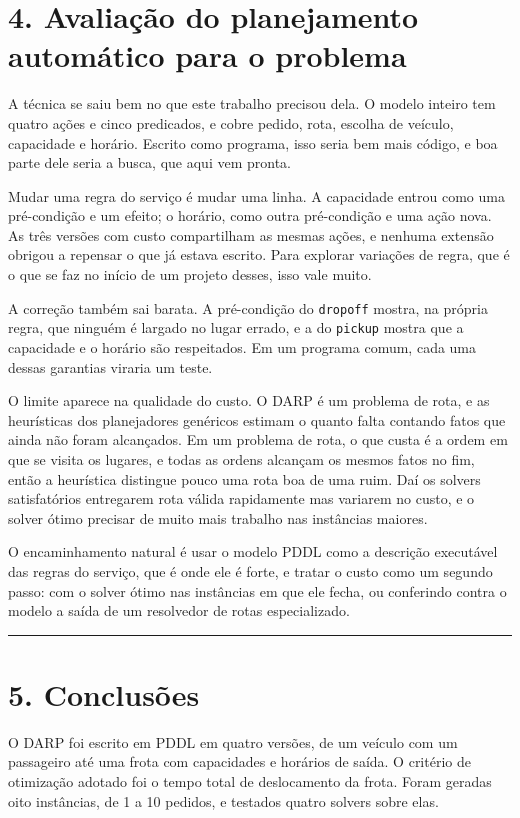 \documentclass[11pt,a4paper]{article}
\newcommand{\cod}[1]{\texttt{#1}}
\newcommand{\separador}{\begin{center}\rule{0.45\linewidth}{0.4pt}\end{center}}
\begin{document}
\section*{4. Avaliação do planejamento automático para o problema}

A técnica se saiu bem no que este trabalho precisou dela. O modelo inteiro tem quatro ações e cinco predicados, e cobre pedido, rota, escolha de veículo, capacidade e horário. Escrito como programa, isso seria bem mais código, e boa parte dele seria a busca, que aqui vem pronta.

Mudar uma regra do serviço é mudar uma linha. A capacidade entrou como uma pré-condição e um efeito; o horário, como outra pré-condição e uma ação nova. As três versões com custo compartilham as mesmas ações, e nenhuma extensão obrigou a repensar o que já estava escrito. Para explorar variações de regra, que é o que se faz no início de um projeto desses, isso vale muito.

A correção também sai barata. A pré-condição do \cod{dropoff} mostra, na própria regra, que ninguém é largado no lugar errado, e a do \cod{pickup} mostra que a capacidade e o horário são respeitados. Em um programa comum, cada uma dessas garantias viraria um teste.

O limite aparece na qualidade do custo. O DARP é um problema de rota, e as heurísticas dos planejadores genéricos estimam o quanto falta contando fatos que ainda não foram alcançados. Em um problema de rota, o que custa é a ordem em que se visita os lugares, e todas as ordens alcançam os mesmos fatos no fim, então a heurística distingue pouco uma rota boa de uma ruim. Daí os solvers satisfatórios entregarem rota válida rapidamente mas variarem no custo, e o solver ótimo precisar de muito mais trabalho nas instâncias maiores.

O encaminhamento natural é usar o modelo PDDL como a descrição executável das regras do serviço, que é onde ele é forte, e tratar o custo como um segundo passo: com o solver ótimo nas instâncias em que ele fecha, ou conferindo contra o modelo a saída de um resolvedor de rotas especializado.

\separador

\section*{5. Conclusões}

O DARP foi escrito em PDDL em quatro versões, de um veículo com um passageiro até uma frota com capacidades e horários de saída. O critério de otimização adotado foi o tempo total de deslocamento da frota. Foram geradas oito instâncias, de 1 a 10 pedidos, e testados quatro solvers sobre elas.
\end{document}
